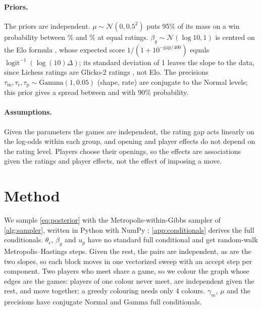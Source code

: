 \documentclass[12pt]{article}
\newcommand{\logistic}{\operatorname{logit}^{-1}}
\newcommand{\Normal}{\mathcal{N}}
\newcommand{\Gam}{\text{Gamma}}
\newcommand{\taum}{\tau_{\mathrm{m}}}
\newcommand{\taur}{\tau_{\mathrm{r}}}
\newcommand{\taup}{\tau_{\mathrm{p}}}
\begin{document}
\paragraph{Priors.} The priors are independent. $\mu \sim \Normal(0, 0.5^2)$ puts 95\% of its mass on a win probability between \priorWinLow\% and \priorWinHigh\% at equal ratings. $\beta_g \sim \Normal(\log 10, 1)$ is centred on the Elo formula \citep{elo1978rating}, whose expected score $1/(1 + 10^{-\text{gap}/400})$ equals $\logistic(\log(10)\Delta)$; its standard deviation of 1 leaves the slope to the data, since Lichess ratings are Glicko-2 ratings \citep{glickman2001dynamic}, not Elo. The precisions $\taum, \taur, \taup \sim \Gam(1, 0.05)$ (shape, rate) are conjugate to the Normal levels; this prior gives a spread between \priorSpreadLow{} and \priorSpreadHigh{} with 90\% probability.

\paragraph{Assumptions.} Given the parameters the games are independent, the rating gap acts linearly on the log-odds within each group, and opening and player effects do not depend on the rating level. Players choose their openings, so the effects are associations given the ratings and player effects, not the effect of imposing a move.

\section{Method}\label{sec:method}

We sample \eqref{eq:posterior} with the Metropolis-within-Gibbs sampler of \cref{alg:sampler}, written in Python with NumPy \citep{harris2020array}; \cref{app:conditionals} derives the full conditionals. $\theta_c$, $\beta_g$ and $u_p$ have no standard full conditional and get random-walk Metropolis--Hastings steps. Given the rest, the pairs are independent, as are the two slopes, so each block moves in one vectorized sweep with an accept step per component. Two players who meet share a game, so we colour the graph whose edges are the games: players of one colour never meet, are independent given the rest, and move together; a greedy colouring needs only 4 colours. $\gamma_m$, $\mu$ and the precisions have conjugate Normal and Gamma full conditionals.
\end{document}
